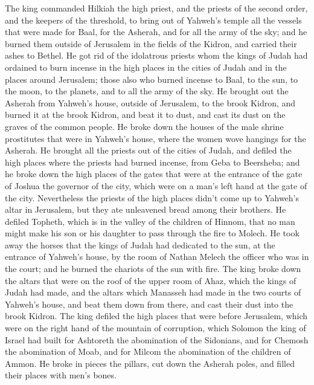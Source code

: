  The king commanded Hilkiah the high priest, and the
priests of the second order, and the keepers of the threshold, to bring
out of Yahweh's temple all the vessels that were made for Baal, for the
Asherah, and for all the army of the sky; and he burned them outside of
Jerusalem in the fields of the Kidron, and carried their ashes to
Bethel.  He got rid of the idolatrous priests whom the
kings of Judah had ordained to burn incense in the high places in the
cities of Judah and in the places around Jerusalem; those also who
burned incense to Baal, to the sun, to the moon, to the planets, and to
all the army of the sky.  He brought out the Asherah from
Yahweh's house, outside of Jerusalem, to the brook Kidron, and burned it
at the brook Kidron, and beat it to dust, and cast its dust on the
graves of the common people.  He broke down the houses of
the male shrine prostitutes that were in Yahweh's house, where the women
wove hangings for the Asherah.  He brought all the priests
out of the cities of Judah, and defiled the high places where the
priests had burned incense, from Geba to Beersheba; and he broke down
the high places of the gates that were at the entrance of the gate of
Joshua the governor of the city, which were on a man's left hand at the
gate of the city.  Nevertheless the priests of the high
places didn't come up to Yahweh's altar in Jerusalem, but they ate
unleavened bread among their brothers.  He defiled
Topheth, which is in the valley of the children of Hinnom, that no man
might make his son or his daughter to pass through the fire to Molech.
 He took away the horses that the kings of Judah had
dedicated to the sun, at the entrance of Yahweh's house, by the room of
Nathan Melech the officer who was in the court; and he burned the
chariots of the sun with fire.  The king broke down the
altars that were on the roof of the upper room of Ahaz, which the kings
of Judah had made, and the altars which Manasseh had made in the two
courts of Yahweh's house, and beat them down from there, and cast their
dust into the brook Kidron.  The king defiled the high
places that were before Jerusalem, which were on the right hand of the
mountain of corruption, which Solomon the king of Israel had built for
Ashtoreth the abomination of the Sidonians, and for Chemosh the
abomination of Moab, and for Milcom the abomination of the children of
Ammon.  He broke in pieces the pillars, cut down the
Asherah poles, and filled their places with men's bones.

